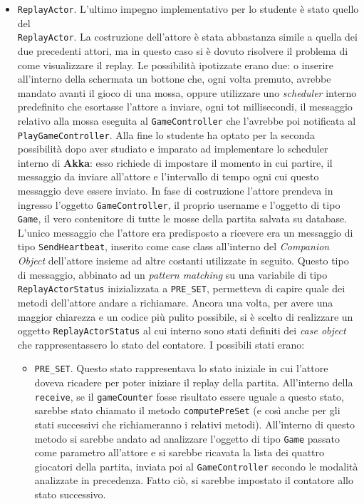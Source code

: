\begin{itemize}
	     
     \item \texttt{ReplayActor}.
     L'ultimo impegno implementativo per lo studente è stato quello del \\ \texttt{ReplayActor}. La costruzione dell'attore è stata abbastanza simile a quella dei due precedenti attori, ma in questo caso si è dovuto risolvere il problema di come visualizzare il replay. Le possibilità ipotizzate erano due: o inserire all'interno della schermata un bottone che, ogni volta premuto, avrebbe mandato avanti il gioco di una mossa, oppure utilizzare uno \textit{scheduler} interno predefinito che esortasse l'attore a inviare, ogni tot millisecondi, il messaggio relativo alla mossa eseguita al \texttt{GameController} che l'avrebbe poi notificata al \texttt{PlayGameController}. Alla fine lo studente ha optato per la seconda possibilità dopo aver studiato e imparato ad implementare lo scheduler interno di \textbf{Akka}: esso richiede di impostare il momento in cui partire, il messaggio da inviare all'attore e l'intervallo di tempo ogni cui questo messaggio deve essere inviato. In fase di costruzione l'attore prendeva in ingresso l'oggetto \texttt{GameController}, il proprio username e l'oggetto di tipo \texttt{Game}, il vero contenitore di tutte le mosse della partita salvata su database. L'unico messaggio che l'attore era predisposto a ricevere era un messaggio di tipo \texttt{SendHeartbeat}, inserito come case class all'interno del \textit{Companion Object} dell'attore insieme ad altre costanti utilizzate in seguito. Questo tipo di messaggio, abbinato ad un \textit{pattern matching} su una variabile di tipo \texttt{ReplayActorStatus} inizializzata a \texttt{PRE\_SET}, permetteva di capire quale dei metodi dell'attore andare a richiamare. Ancora una volta, per avere una maggior chiarezza e un codice più pulito possibile, si è scelto di realizzare un oggetto \texttt{ReplayActorStatus} al cui interno sono stati definiti dei \textit{case object} che rappresentassero lo stato del contatore. I possibili stati erano:
     
     \begin {itemize}
   
     \item \texttt{PRE\_SET}. Questo stato rappresentava lo stato iniziale in cui l'attore doveva ricadere per poter iniziare il replay della partita. All'interno della \texttt{receive}, se il \texttt{gameCounter} fosse risultato essere uguale a questo stato, sarebbe stato chiamato il metodo \texttt{computePreSet} (e così anche per gli stati successivi che richiameranno i relativi metodi). All'interno di questo metodo si sarebbe andato ad analizzare l'oggetto di tipo \texttt{Game} passato come parametro all'attore e si sarebbe ricavata la lista dei quattro giocatori della partita, inviata poi al \texttt{GameController} secondo le modalità analizzate in precedenza. Fatto ciò, si sarebbe impostato il contatore allo stato successivo.
   

\end{itemize}
\end{itemize}
